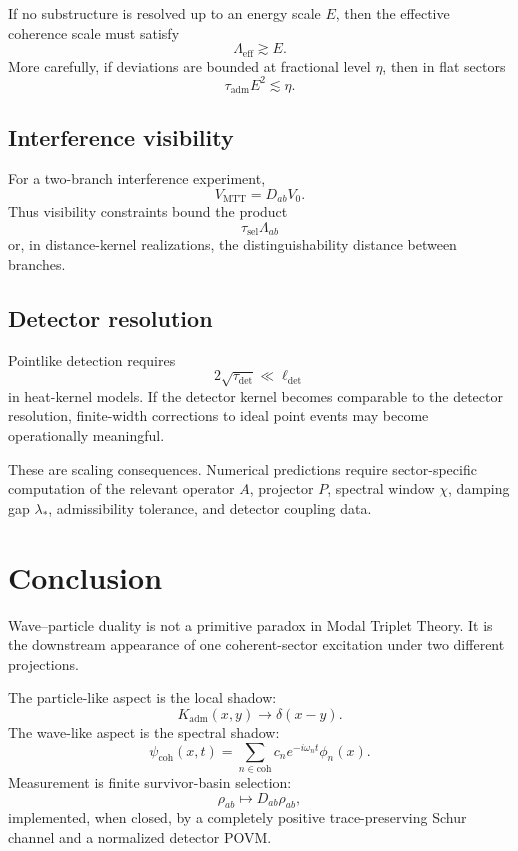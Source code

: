 \documentclass[11pt]{article}
\newcommand{\Kadm}{K_{\mathrm{adm}}}
\newcommand{\ta}{\tau_{\mathrm{adm}}}
\newcommand{\Leff}{\Lambda_{\mathrm{eff}}}
\newcommand{\coh}{\mathrm{coh}}
\newcommand{\MTT}{\mathrm{MTT}}
\begin{document}
If no substructure is resolved up to an energy scale \(E\), then the effective coherence scale
must satisfy
\[
  \Leff\gtrsim E.
\]
More carefully, if deviations are bounded at fractional level \(\eta\), then in flat sectors
\[
  \ta E^2\lesssim \eta.
\]

\subsection{Interference visibility}

For a two-branch interference experiment,
\[
  V_{\MTT}=D_{ab}V_0.
\]
Thus visibility constraints bound the product
\[
  \tau_{\mathrm{sel}}\Lambda_{ab}
\]
or, in distance-kernel realizations, the distinguishability distance between branches.

\subsection{Detector resolution}

Pointlike detection requires
\[
  2\sqrt{\tau_{\mathrm{det}}}\ll \ell_{\mathrm{det}}
\]
in heat-kernel models. If the detector kernel becomes comparable to the detector resolution,
finite-width corrections to ideal point events may become operationally meaningful.

\begin{remark}
These are scaling consequences. Numerical predictions require sector-specific computation of
the relevant operator \(A\), projector \(P\), spectral window \(\chi\), damping gap
\(\lambda_\ast\), admissibility tolerance, and detector coupling data.
\end{remark}

\section{Conclusion}

Wave--particle duality is not a primitive paradox in Modal Triplet Theory. It is the downstream
appearance of one coherent-sector excitation under two different projections.

The particle-like aspect is the local shadow:
\[
  \Kadm(x,y)\to\delta(x-y).
\]
The wave-like aspect is the spectral shadow:
\[
  \psi_{\coh}(x,t)
  =
  \sum_{n\in\coh}
  c_ne^{-i\omega_nt}\phi_n(x).
\]
Measurement is finite survivor-basin selection:
\[
  \rho_{ab}\mapsto D_{ab}\rho_{ab},
\]
implemented, when closed, by a completely positive trace-preserving Schur channel and a
normalized detector POVM.
\end{document}
